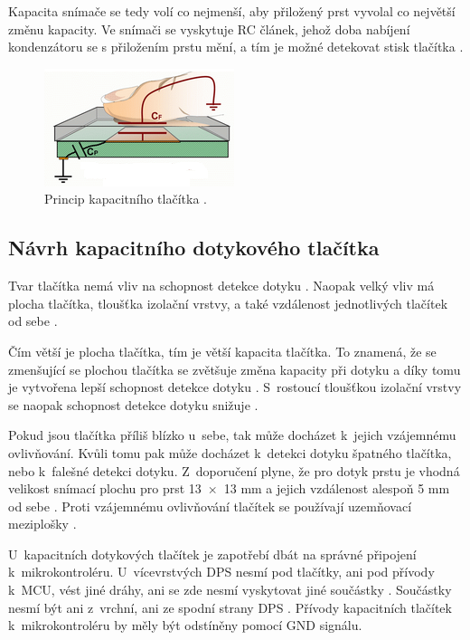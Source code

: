 Kapacita snímače se tedy volí co nejmenší, aby přiložený prst vyvolal co největší změnu kapacity. Ve snímači se vyskytuje
RC článek, jehož doba nabíjení kondenzátoru se s přiložením prstu mění, a tím je možné detekovat stisk tlačítka \cite{PrincipKapTl}. 

\begin{figure}[!h]
  \begin{center}
    \includegraphics[scale=1]{obrazky/kapacitni_princip.png}
  \end{center}
  \caption[Princip kapacitního tlačítka]{Princip kapacitního tlačítka \cite{PrincipKapTl}.}
\end{figure}

\subsection{Návrh kapacitního dotykového tlačítka}
Tvar tlačítka nemá vliv na schopnost detekce dotyku \cite{PrincipKapTl}. Naopak velký vliv má plocha tlačítka, tloušťka
izolační vrstvy, a také vzdálenost jednotlivých tlačítek od sebe \cite{PrincipKapTl}. 

Čím větší je plocha tlačítka, tím je větší kapacita tlačítka. To znamená, že se zmenšující se plochou tlačítka se zvětšuje změna kapacity 
při dotyku a díky tomu je vytvořena lepší schopnost detekce 
dotyku \cite{PrincipKapTl}. S~rostoucí tloušťkou izolační vrstvy se naopak schopnost detekce dotyku snižuje \cite{PrincipKapTl}.

Pokud jsou tlačítka příliš blízko u~sebe, tak může docházet k~jejich vzájemnému ovlivňování. Kvůli tomu pak může docházet
k~detekci dotyku špatného tlačítka, nebo k~falešné detekci dotyku. Z~doporučení plyne, že pro dotyk prstu je vhodná velikost snímací 
plochu pro prst 13~$\times$~13 mm a jejich vzdálenost alespoň 5 mm od sebe \cite{PrincipKapTl}. Proti vzájemnému ovlivňování tlačítek
se používají uzemňovací meziplošky \cite{PrincipKapTl}. 

U~kapacitních dotykových tlačítek je zapotřebí dbát na správné připojení k~mikrokontroléru. U~vícevrstvých DPS nesmí pod tlačítky, ani pod přívody
k~MCU, vést jiné dráhy, ani se zde nesmí vyskytovat jiné součástky \cite{PrincipKapTl}. Součástky nesmí být ani z~vrchní, ani ze spodní 
strany DPS \cite{PrincipKapTl}. Přívody kapacitních tlačítek k~mikrokontroléru by měly být odstíněny pomocí GND signálu.

